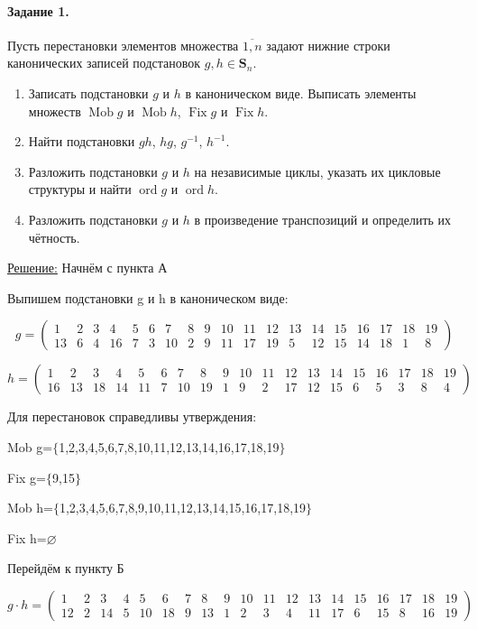 \documentclass[utf8,14pt,a4paper,oneside,russian]{book}
\DeclareMathOperator{\mob}{Mob}
\DeclareMathOperator{\fix}{Fix}
\DeclareMathOperator{\ord}{ord}
\begin{document}
	\paragraph*{Задание 1.} Пусть перестановки элементов множества $\overline{1,n}$ задают нижние строки канонических записей подстановок $g,h\in \mathbf{S}_n$.
	\begin{enumerate}[label=\asbuk{enumi})]
		\item Записать подстановки $g$ и $h$ в каноническом виде. Выписать элементы множеств $\mob g$ и $\mob h$, $\fix g$ и $\fix h$.
		\item Найти подстановки $gh$, $hg$, $g^{-1}$, $h^{-1}$.
		\item Разложить подстановки $g$ и $h$ на независимые циклы, указать их цикловые структуры и найти $\ord g$ и $\ord h$.
		\item Разложить подстановки $g$ и $h$ в произведение транспозиций и определить их чётность.
	\end{enumerate}
	\underline{Решение:} Начнём с пункта А
	
	Выпишем подстановки g и h в каноническом виде:
	
	\[ g = \left( 
	\begin{array}{ccccccccccccccccccc}
	1&2&3&4&5&6&7&8&9&10&11&12&13&14&15&16&17&18&19\\
	13&6&4&16&7&3&10&2&9&11&17&19&5&12&15&14&18&1&8
	\end{array} 
	\right) \]
	
	\[ h = \left( 
	\begin{array}{ccccccccccccccccccc}
	1&2&3&4&5&6&7&8&9&10&11&12&13&14&15&16&17&18&19\\
	16&13&18&14&11&7&10&19&1&9&2&17&12&15&6&5&3&8&4
	\end{array} 
	\right) \]
	
	Для перестановок справедливы утверждения:
	
	Mob g=$\lbrace$1,2,3,4,5,6,7,8,10,11,12,13,14,16,17,18,19$\rbrace$
	
	Fix g=$\lbrace$9,15$\rbrace$
	
	Mob h=$\lbrace$1,2,3,4,5,6,7,8,9,10,11,12,13,14,15,16,17,18,19$\rbrace$
	
	Fix h=$\varnothing$
	
	\vspace{\baselineskip}
	
	Перейдём к пункту Б
	
	\[ g \cdot h = \left( 
	\begin{array}{ccccccccccccccccccc}
	1&2&3&4&5&6&7&8&9&10&11&12&13&14&15&16&17&18&19\\
	12&2&14&5&10&18&9&13&1&2&3&4&11&17&6&15&8&16&19
	\end{array} 
	\right) \]
	
\end{document}
